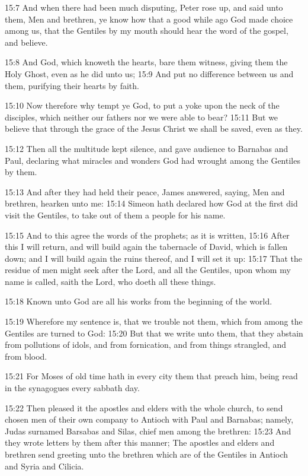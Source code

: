 15:7 And when there had been much disputing, Peter rose up, and said
unto them, Men and brethren, ye know how that a good while ago God
made choice among us, that the Gentiles by my mouth should hear the
word of the gospel, and believe.

15:8 And God, which knoweth the hearts, bare them witness, giving them
the Holy Ghost, even as he did unto us; 15:9 And put no difference
between us and them, purifying their hearts by faith.

15:10 Now therefore why tempt ye God, to put a yoke upon the neck of
the disciples, which neither our fathers nor we were able to bear?
15:11 But we believe that through the grace of the \LORD Jesus Christ
we shall be saved, even as they.

15:12 Then all the multitude kept silence, and gave audience to
Barnabas and Paul, declaring what miracles and wonders God had wrought
among the Gentiles by them.

15:13 And after they had held their peace, James answered, saying, Men
and brethren, hearken unto me: 15:14 Simeon hath declared how God at
the first did visit the Gentiles, to take out of them a people for his
name.

15:15 And to this agree the words of the prophets; as it is written,
15:16 After this I will return, and will build again the tabernacle of
David, which is fallen down; and I will build again the ruins thereof,
and I will set it up: 15:17 That the residue of men might seek after
the Lord, and all the Gentiles, upon whom my name is called, saith the
Lord, who doeth all these things.

15:18 Known unto God are all his works from the beginning of the
world.

15:19 Wherefore my sentence is, that we trouble not them, which from
among the Gentiles are turned to God: 15:20 But that we write unto
them, that they abstain from pollutions of idols, and from
fornication, and from things strangled, and from blood.

15:21 For Moses of old time hath in every city them that preach him,
being read in the synagogues every sabbath day.

15:22 Then pleased it the apostles and elders with the whole church,
to send chosen men of their own company to Antioch with Paul and
Barnabas; namely, Judas surnamed Barsabas and Silas, chief men among
the brethren: 15:23 And they wrote letters by them after this manner;
The apostles and elders and brethren send greeting unto the brethren
which are of the Gentiles in Antioch and Syria and Cilicia.

